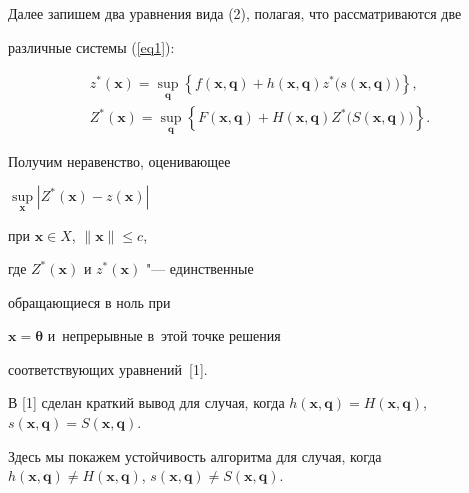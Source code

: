 Далее запишем два уравнения вида (2), полагая, что рассматриваются две 

различные системы (\ref{eq1}):

\begin{gather}

z^\ast (\boldsymbol x)=\sup \limits_{\boldsymbol q} 

\left\{ 

f(\boldsymbol x, \boldsymbol q)+

h(\boldsymbol x, \boldsymbol q)z^\ast \bigl(s(\boldsymbol x, \boldsymbol q)\bigr) \right\},

\\ 

Z^\ast (\boldsymbol x)=\sup \limits_{\boldsymbol q} 

\left\{ 

F(\boldsymbol x, \boldsymbol q)+

H(\boldsymbol x, \boldsymbol q)Z^\ast \bigl(S(\boldsymbol x, \boldsymbol q)\bigr) \right\}.

\end{gather}





Получим неравенство, оценивающее 

$\sup \limits_{\boldsymbol x} 

\left| Z^\ast (\boldsymbol x)-z(\boldsymbol x) \right|$

при $\boldsymbol x\in X$, $\| \boldsymbol x\|\leqslant c$,

где $Z^\ast (\boldsymbol x)$ и $z^\ast (\boldsymbol x)$ "--- единственные 

обращающиеся в ноль при 

$\boldsymbol x=\boldsymbol \theta $ и~непрерывные в~этой точке решения 

соответствующих уравнений~[1].



\begin{remark}

В [1] сделан краткий вывод для случая, когда $h(\boldsymbol x, \boldsymbol q)=

H(\boldsymbol x, \boldsymbol q)$, $s(\boldsymbol x, \boldsymbol q)=S(\boldsymbol x, \boldsymbol q)$. 

Здесь мы покажем устойчивость алгоритма для случая, когда $h(\boldsymbol x, \boldsymbol q)\ne H(\boldsymbol x, \boldsymbol q)$, $s(\boldsymbol  x, \boldsymbol q)\ne S(\boldsymbol x, \boldsymbol q).$ 

\end{remark}



